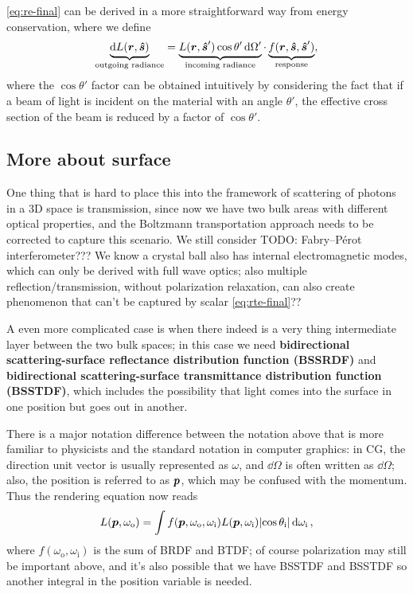 \documentclass[hyperref, a4paper]{article}
\newcommand*{\concept}[1]{{\textbf{#1}}}
\begin{document}
\eqref{eq:re-final} can be derived in a more straightforward way 
from energy conservation, 
where we define 
\begin{equation}
    \underbrace{\dd{L(\vb*{r}, \vu*{s})}}_{\text{outgoing radiance}} 
    = \underbrace{L(\vb*{r}, \vu*{s}') \cos \theta' \dd{\Omega'}}_{\text{incoming radiance}} 
    \cdot \underbrace{f(\vb*{r}, \vu*{s}, \vu*{s}')}_{\text{response}} ,
\end{equation}
where the $\cos \theta'$ factor can be obtained intuitively 
by considering the fact that if a beam of light 
is incident on the material with an angle $\theta'$, 
the effective cross section of the beam is reduced by a factor of $\cos \theta'$.

\subsection{More about surface}


One thing that is hard to place this into the framework 
of scattering of photons in a 3D space
is transmission, 
since now we have two bulk areas with different optical properties,
and the Boltzmann transportation approach needs to be corrected 
to capture this scenario.
We still consider TODO: Fabry–Pérot interferometer??? We know a crystal ball also has internal electromagnetic modes, which can only be derived with full wave optics; 
also multiple reflection/transmission, 
without polarization relaxation,
can also create phenomenon that can't be captured by scalar \eqref{eq:rte-final}??

A even more complicated case is when there indeed is 
a very thing intermediate layer between the two bulk spaces; 
in this case we need \concept{bidirectional scattering-surface reflectance distribution function (BSSRDF)}
and \concept{bidirectional scattering-surface transmittance distribution function (BSSTDF)},
which includes the possibility that light comes into the surface in one position 
but goes out in another.

There is a major notation difference between the notation above that is more familiar to physicists
and the standard notation in computer graphics:
in CG, the direction unit vector is usually represented as $\omega$, 
and $\dd{\Omega}$ is often written as $\dd{\Omega}$;
also, the position is referred to as $\vb*{p}$, 
which may be confused with the momentum.
Thus the rendering equation now reads 
\begin{equation}
    L(\vb*{p}, \omega_{\text{o}}) 
    = \int f(\vb*{p}, \omega_{\text{o}}, \omega_{\text{i}}) 
    L(\vb*{p}, \omega_{\text{i}}) \abs{\cos \theta_{\text{i}}} \dd{\omega_{\text{i}}},
\end{equation}
where $f(\omega_{\text{o}}, \omega_{\text{i}})$ 
is the sum of BRDF and BTDF; 
of course polarization may still be important above, 
and it's also possible that we have BSSTDF and BSSTDF 
so another integral in the position variable is needed.
\end{document}

